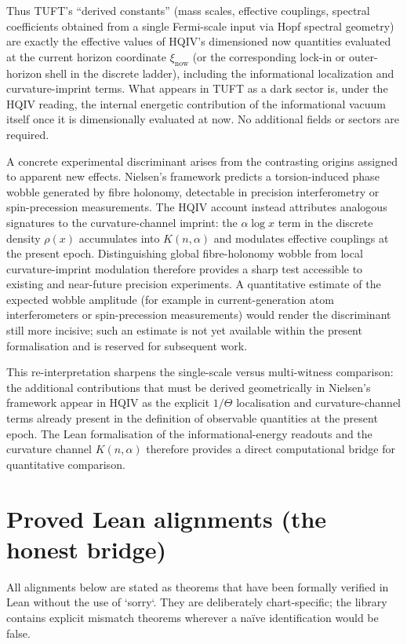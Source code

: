 \documentclass[11pt]{article}
\begin{document}
Thus TUFT's ``derived constants'' (mass scales, effective couplings,
spectral coefficients obtained from a single Fermi-scale input via Hopf
spectral geometry) are exactly the effective values of HQIV's
dimensioned now quantities evaluated at the current horizon coordinate
$\xi_{\mathrm{now}}$ (or the corresponding lock-in or outer-horizon
shell in the discrete ladder), including the informational localization
and curvature-imprint terms. What appears in TUFT as a dark sector is,
under the HQIV reading, the internal energetic contribution of the
informational vacuum itself once it is dimensionally evaluated at now.
No additional fields or sectors are required.

A concrete experimental discriminant arises from the contrasting origins
assigned to apparent new effects. Nielsen's framework predicts a
torsion-induced phase wobble generated by fibre holonomy, detectable in
precision interferometry or spin-precession measurements. The HQIV
account instead attributes analogous signatures to the curvature-channel
imprint: the $\alpha\log x$ term in the discrete density $\rho(x)$
accumulates into $K(n,\alpha)$ and modulates effective couplings at the
present epoch. Distinguishing global fibre-holonomy wobble from local
curvature-imprint modulation therefore provides a sharp test accessible
to existing and near-future precision experiments. A quantitative
estimate of the expected wobble amplitude (for example in
current-generation atom interferometers or spin-precession measurements)
would render the discriminant still more incisive; such an estimate is
not yet available within the present formalisation and is reserved for
subsequent work.

This re-interpretation sharpens the single-scale versus multi-witness
comparison: the additional contributions that must be derived
geometrically in Nielsen's framework appear in HQIV as the explicit
$1/\Theta$ localisation and curvature-channel terms already present in
the definition of observable quantities at the present epoch. The Lean
formalisation of the informational-energy readouts and the curvature
channel $K(n,\alpha)$ therefore provides a direct computational bridge
for quantitative comparison.

\section{Proved Lean alignments (the honest bridge)}

All alignments below are stated as theorems that have been formally
verified in Lean without the use of `sorry`. They are deliberately
chart-specific; the library contains explicit mismatch theorems wherever
a naïve identification would be false.
\end{document}
